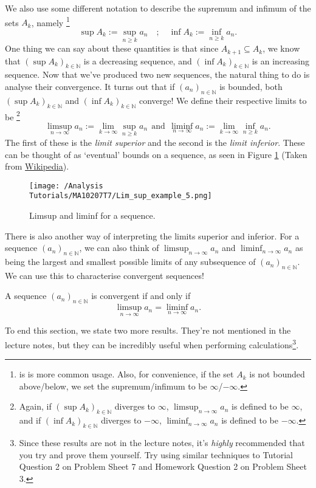 \documentclass[
  10pt,
  a4paper]{article}
\theoremstyle{plain}
\theoremstyle{plain}
\theoremstyle{plain}
\theoremstyle{plain}
\theoremstyle{plain}
\theoremstyle{definition}
\theoremstyle{definition}
\theoremstyle{definition}
\theoremstyle{remark}
\let\BeginKnitrBlock\begin \let\EndKnitrBlock\end
\begin{document}
We also use some different notation to describe the supremum and infimum of the sets \(A_k\), namely \footnote{is is more common usage. Also, for convenience, if the set \(A_k\) is not bounded above/below, we set the supremum/infimum to be \(\infty\)/\(-\infty\).} \[\sup A_k := \sup_{n\geq k}a_n \quad ; \quad \inf A_k := \inf_{n \geq k}a_n.\] One thing we can say about these quantities is that since \(A_{k+1} \subseteq A_k\), we know that \((\sup A_k)_{k\in\mathbb{N}}\) is a decreasing sequence, and \((\inf A_k)_{k\in\mathbb{N}}\) is an increasing sequence. Now that we've produced two new sequences, the natural thing to do is analyse their convergence. It turns out that if \((a_n)_{n\in\mathbb{N}}\) is bounded, both \((\sup A_k)_{k\in\mathbb{N}}\) and \((\inf A_k)_{k\in\mathbb{N}}\) converge! We define their respective limits to be \footnote{Again, if \((\sup A_k)_{k\in\mathbb{N}}\) diverges to \(\infty\), \(\limsup_{n \to \infty} a_n\) is defined to be \(\infty\), and if \((\inf A_k)_{k\in\mathbb{N}}\) diverges to \(-\infty\), \(\liminf_{n \to \infty} a_n\) is defined to be \(-\infty\).} \[\limsup_{n \to \infty} a_n := \lim_{k\to\infty}\sup_{n\geq k}a_n \;\, \text{and} \;\, \liminf_{n \to \infty} a_n := \lim_{k\to\infty}\inf_{n\geq k}a_n.\] The first of these is the \emph{limit superior} and the second is the \emph{limit inferior}. These can be thought of as `eventual' bounds on a sequence, as seen in Figure \ref{fig:limsup} (Taken from \href{https://en.wikipedia.org/wiki/Limit_inferior_and_limit_superior}{Wikipedia}).

\begin{figure}
\centering
\texttt{[image: /Analysis Tutorials/MA10207T7/Lim\_sup\_example\_5.png]}
\caption{\label{fig:limsup} Limsup and liminf for a sequence.}
\end{figure}

There is also another way of interpreting the limits superior and inferior. For a sequence \((a_n)_{n\in\mathbb{N}}\), we can also think of \(\limsup_{n\to\infty} a_n\) and \(\liminf_{n \to \infty}a_n\) as being the largest and smallest possible limits of any subsequence of \((a_n)_{n\in\mathbb{N}}\). We can use this to characterise convergent sequences!

\BeginKnitrBlock{theorem}
{\label{thm:thm1} }A sequence \((a_n)_{n\in\mathbb{N}}\) is convergent if and only if \[\limsup_{n \to \infty} a_n = \liminf_{n \to \infty} a_n.\]
\EndKnitrBlock{theorem}
To end this section, we state two more results. They're not mentioned in the lecture notes, but they can be incredibly useful when performing calculations\footnote{Since these results are not in the lecture notes, it's \emph{highly} recommended that you try and prove them yourself. Try using similar techniques to Tutorial Question 2 on Problem Sheet 7 and Homework Question 2 on Problem Sheet 3.}.
\end{document}
